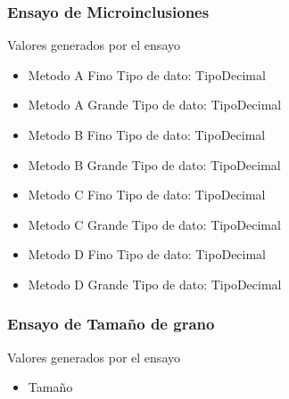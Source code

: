 \documentclass{article}
\begin{document}
\subsubsection{Ensayo de  Microinclusiones}
\par Valores generados por el ensayo
\begin{itemize}
	\item{Metodo A Fino}
		\subitem Tipo de dato: \gls{TipoDecimal}
	\item{Metodo A Grande}
		\subitem Tipo de dato: \gls{TipoDecimal}
	\item{Metodo B Fino}
		\subitem Tipo de dato: \gls{TipoDecimal}
	\item{Metodo B Grande}
		\subitem Tipo de dato: \gls{TipoDecimal}
	\item{Metodo C Fino}
		\subitem Tipo de dato: \gls{TipoDecimal}
	\item{Metodo C Grande}
		\subitem Tipo de dato: \gls{TipoDecimal}
	\item{Metodo D Fino}
		\subitem Tipo de dato: \gls{TipoDecimal}
	\item{Metodo D Grande}
		\subitem Tipo de dato: \gls{TipoDecimal}
\end{itemize}

\subsubsection{Ensayo de Tamaño de grano }
\par Valores generados por el ensayo
\begin{itemize}
	\item{Tamaño}

\end{itemize}

\newpage
\printglossaries
\end{document}
